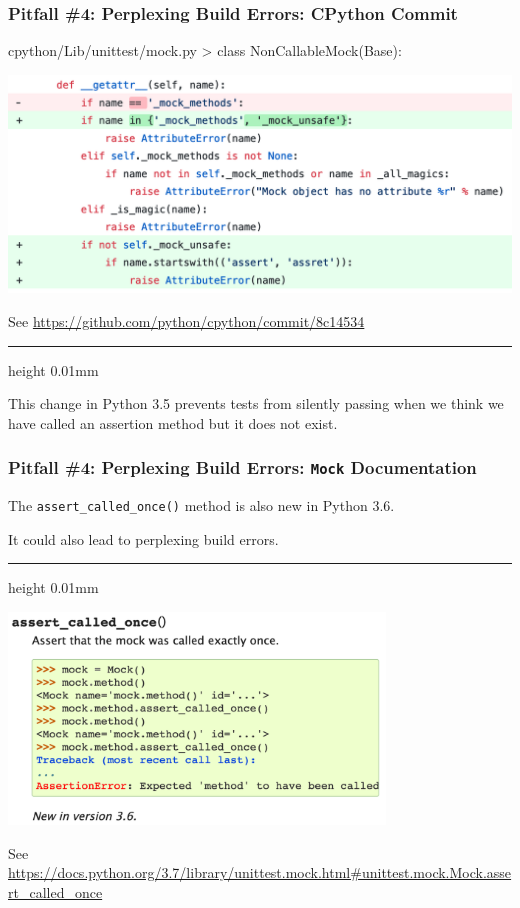 \documentclass[xcolor={svgnames}]{beamer}
\newcommand{\ttcode}[2][]{\lstinline[style=plain,basicstyle=\ttfamily#1]{#2}}
\newcommand{\pycode}[2][]{\lstinline[style=python,#1]{#2}}
\newcommand{\hr}[2]{\vspace{#1}\hrule height 0.01mm\vspace{#2}}
\begin{document}
\begin{frame}[t,fragile]
    \frametitle{Pitfall \#4: Perplexing Build Errors: CPython Commit}

    \begin{txtenv}[gobble=4]
    cpython/Lib/unittest/mock.py > class NonCallableMock(Base):
    \end{txtenv}

    \vspace{-6mm}

    \hspace{-1mm}
    \includegraphics[width=\textwidth]{img/mock-unsafe-diff.png}

    \vspace{-3mm}
    {
        \scriptsize
        See \url{https://github.com/python/cpython/commit/8c14534}
    }

    \hr{2mm}{-0.5mm}

    \footnotesize
    This change in Python 3.5 prevents tests from silently passing when
    we think we have called an assertion method but it does not exist.
\end{frame}


\begin{frame}[t,fragile]
    \frametitle{Pitfall \#4: Perplexing Build Errors: \ttcode{Mock}
    Documentation}

    The \pycode{assert_called_once()} method is also new in Python 3.6.

    It could also lead to perplexing build errors.

    \hr{3mm}{-1mm}

    \includegraphics[width=0.75\textwidth]{img/assert-called-once-doc.png}

    \vspace{-2.5mm}
    {
        \tiny
        See
        \url{https://docs.python.org/3.7/library/unittest.mock.html#unittest.mock.Mock.assert_called_once}
    }
\end{frame}
\end{document}
